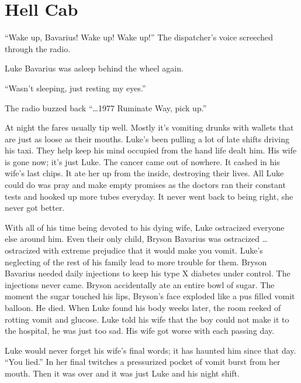 \chapter{Hell Cab}


``Wake up, Bavarius! Wake up! Wake up!'' The
dispatcher's voice screeched through the radio.



Luke Bavarius was asleep behind the wheel again.



``Wasn't sleeping, just resting my eyes.''

The radio buzzed back ``{\ldots}1977 Ruminate Way, pick
up.''



At night the fares usually tip well. Mostly it's vomiting
drunks with wallets that are just as loose as their mouths.
Luke's been pulling a lot of late shifts driving his taxi.
They help keep his mind occupied from the hand life dealt him. His
wife is gone now; it's just Luke. The cancer came out of
nowhere. It cashed in his wife's last chips. It ate her up
from the inside, destroying their lives. All Luke could do was pray
and make empty promises as the doctors ran their constant tests and
hooked up more tubes everyday. It never went back to being right,
she never got better.



With all of his time being devoted to his dying wife, Luke
ostracized everyone else around him. Even their only child, Bryson
Bavarius was ostracized {\ldots} ostracized with extreme prejudice
that it would make you vomit. Luke's neglecting of the rest
of his family lead to more trouble for them. Bryson Bavarius needed
daily injections to keep his type X diabetes under control. The
injections never came. Bryson accidentally ate an entire bowl of
sugar. The moment the sugar touched his lips, Bryson's face
exploded like a pus filled vomit balloon. He died. When Luke found
his body weeks later, the room reeked of rotting vomit and glucose.
Luke told his wife that the boy could not make it to the hospital,
he was just too sad. His wife got worse with each passing
day.



Luke would never forget his wife's final words; it has
haunted him since that day. ``You lied.'' In her final
twitches a pressurized pocket of vomit burst from her mouth. Then
it was over and it was just Luke and his night shift.



